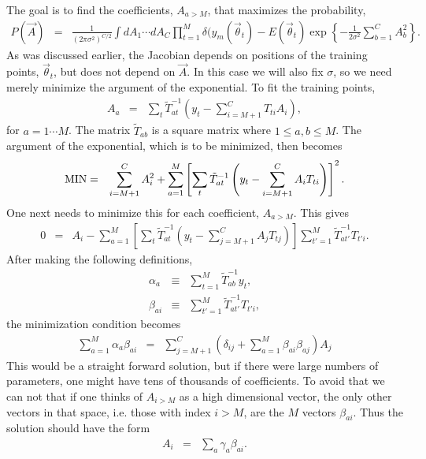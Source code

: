 \documentclass[UserManual.tex]{subfiles}
\begin{document}
The goal is to find the coefficients, $A_{a>M}$, that maximizes the probability,
\begin{eqnarray}
P(\vec{A})&=&\frac{1}{(2\pi\sigma^2)^{C/2}}\int dA_1\cdots dA_C \prod_{t=1}^M\delta(y_m(\vec{\theta}_t)-E(\vec{\theta}_t)
\exp\left\{
-\frac{1}{2\sigma^2}\sum_{b=1}^C A_b^2
\right\}.
\end{eqnarray}
As was discussed earlier, the Jacobian depends on positions of the training points,  $\vec{\theta}_t$, but does not depend on $\vec{A}$. In this case we will also fix $\sigma$, so we need merely minimize the argument of the exponential. To fit the training points,
\begin{eqnarray}
\label{eq:AofTA}
A_{a}&=&\sum_t \tilde{T}^{-1}_{at}\left(y_t-\sum_{i=M+1}^CT_{ti}A_i\right),
\end{eqnarray}
for $a=1\cdots M$. The matrix $\tilde{T}_{ab}$ is a square matrix where $1\le a,b\le M$. The argument of the exponential, which is to be minimized, then becomes
\begin{eqnarray}
{\rm MIN}&=&\sum_{i=M+1}^C A_i^2+\sum_{a=1}^M\left[\sum_t\tilde{T}^{-1}_{at}\left(y_t-\sum_{i=M+1}^CA_iT_{ti}\right)\right]^2.
\end{eqnarray}
One next needs to minimize this for each coefficient, $A_{a>M}$. This gives
\begin{eqnarray}
0&=&A_i
-\sum_{a=1}^M\left[\sum_t\tilde{T}^{-1}_{at}\left(y_t-\sum_{j=M+1}^CA_jT_{tj}\right)\right]
\sum_{t'=1}^M\tilde{T}_{at'}^{-1}T_{t'i}.
\end{eqnarray}
After making the following definitions,
\begin{eqnarray}
\alpha_a&\equiv&\sum_{t=1}^M\tilde{T}^{-1}_{ab}y_t,\\
\nonumber
\beta_{ai}&\equiv& \sum_{t'=1}^M\tilde{T}_{at'}^{-1}T_{t'i},
\end{eqnarray}
the minimization condition becomes
\begin{eqnarray}
\sum_{a=1}^M\alpha_a\beta_{ai}&=&\sum_{j=M+1}^C \left(\delta_{ij}+\sum_{a=1}^M\beta_{ai}\beta_{aj}\right)A_j
\end{eqnarray}
This would be a straight forward solution, but if there were large numbers of parameters, one might have tens of thousands of coefficients. To avoid that we can not that if one thinks of $A_{i>M}$ as a high dimensional vector, the only other vectors in that space, i.e. those with index $i>M$, are the $M$ vectors $\beta_{ai}$. Thus the solution should have the form
\begin{eqnarray}
\label{eq:AofGamma}
A_{i}&=&\sum_a\gamma_a \beta_{ai}.
\end{eqnarray}
\end{document}
